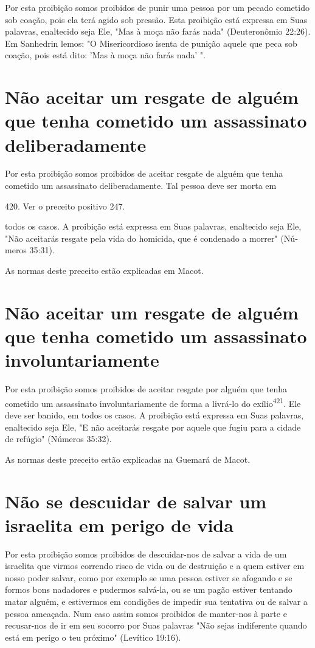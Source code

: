 \begin{itemize}
\begin{enumrate}
\begin{itemize}
\begin{itemize}
\begin{itemize}
Por esta proibição somos proibidos de punir uma pessoa por um pe­cado
cometido sob coação, pois ela terá agido sob pressão. Esta proibição
está expressa em Suas palavras, enaltecido seja Ele, "Mas à moça não
farás nada" (Deuteronômio 22:26). Em Sanhedrin lemos: "O Misericordioso
isenta de pu­nição aquele que peca sob coação, pois está dito: 'Mas à
moça não farás nada' ".

\section{Não aceitar um resgate de alguém que tenha 
cometido um assassinato deliberadamente}

Por esta proibição somos proibidos de aceitar resgate de alguém que
tenha cometido um assassinato deliberadamente. Tal pessoa deve ser morta
em

420. Ver o preceito positivo 247.

todos os casos. A proibição está expressa em Suas palavras, enaltecido
seja Ele, "Não aceitarás resgate pela vida do homicida, que é condenado
a morrer" (Nú­meros 35:31).

As normas deste preceito estão explicadas em Macot.

\section{Não aceitar um resgate de alguém que tenha cometido 
um assassinato involuntariamente}

Por esta proibição somos proibidos de aceitar resgate por alguém que
tenha cometido um assassinato involuntariamente de forma a livrá-lo do
exílio\textsuperscript{421}. Ele deve ser banido, em todos os casos. A
proibição está expressa em Suas palavras, enaltecido seja Ele, "E não
aceitarás resgate por aquele que fugiu para a cidade de refúgio"
(Números 35:32).


As normas deste preceito estão explicadas na Guemará de Macot.

\section{Não se descuidar de salvar um israelita em perigo de vida}

Por esta proibição somos proibidos de descuidar-nos de salvar a vi­da de
um israelita que virmos correndo risco de vida ou de destruição e a quem
estiver em nosso poder salvar, como por exemplo se uma pessoa estiver se
afo­gando e se formos bons nadadores e pudermos salvá-la, ou se um pagão
estiver tentando matar alguém, e estivermos em condições de impedir sua
tentativa ou de salvar a pessoa ameaçada. Num caso assim somos proibidos
de manter-nos à parte e recusar-nos de ir em seu socorro por Suas
palavras "Não sejas in­diferente quando está em perigo o teu próximo"
(Levítico 19:16).


\end{itemize}
\end{itemize}
\end{itemize}
\end{enumrate}
\end{itemize}
